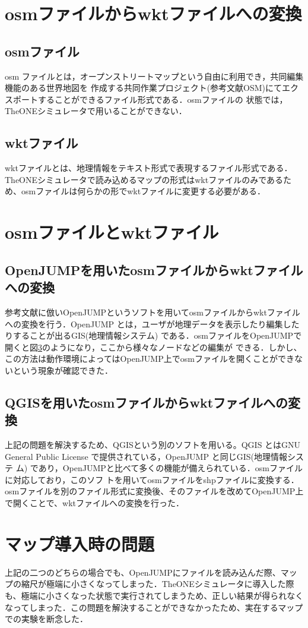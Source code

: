 \documentclass[11pt]{icsthesis}
\begin{document}
\section{osmファイルからwktファイルへの変換}



\subsection{osmファイル}
osm ファイルとは，オープンストリートマップという自由に利用でき，共同編集機能のある世界地図を
作成する共同作業プロジェクト(参考文献OSM)にてエクスポートすることができるファイル形式である．osmファイルの
状態では，TheONEシミュレータで用いることができない．
\subsection{wktファイル}
wktファイルとは、地理情報をテキスト形式で表現するファイル形式である．TheONEシミュレータで読み込めるマップの形式はwktファイルのみであるため、osmファイルは何らかの形でwktファイルに変更する必要がある．
\section{osmファイルとwktファイル}

\subsection{OpenJUMPを用いたosmファイルからwktファイルへの変換}
参考文献に倣いOpenJUMPというソフトを用いてosmファイルからwktファイルへの変換を行う．OpenJUMP とは，ユーザが地理データを表示したり編集したりすることが出るGIS(地理情報システム)
である．osmファイルをOpenJUMPで開くと図\ref{}のようになり，ここから様々なノードなどの編集が
できる．しかし、この方法は動作環境によってはOpenJUMP上でosmファイルを開くことができないという現象が確認できた．
\subsection{QGISを用いたosmファイルからwktファイルへの変換}
上記の問題を解決するため、QGISという別のソフトを用いる。QGIS とはGNU General Public License で提供されている，OpenJUMP と同じGIS(地理情報システ
ム) であり，OpenJUMPと比べて多くの機能が備えられている．osmファイルに対応しており，このソフ
トを用いてosmファイルをshpファイルに変換する．osmファイルを別のファイル形式に変換後、そのファイルを改めてOpenJUMP上で開くことで、wktファイルへの変換を行った．
\section{マップ導入時の問題}
上記の二つのどちらの場合でも、OpenJUMPにファイルを読み込んだ際、マップの縮尺が極端に小さくなってしまった．TheONEシミュレータに導入した際も、極端に小さくなった状態で実行されてしまうため、正しい結果が得られなくなってしまった．この問題を解決することができなかったため、実在するマップでの実験を断念した．
\end{document}
